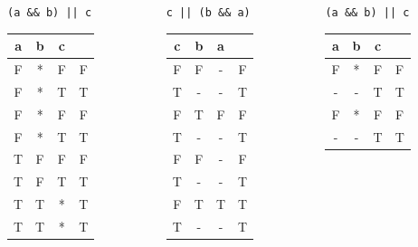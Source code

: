 \documentclass[xcolor = {dvipsnames, table}, aspectratio=169]{beamer}
\begin{document}
\begin{frame}
    \begin{columns}
        \begin{column}{0.3\textwidth}
            \centering
            \lstinline{(a && b) || c}
            \begin{tabular}{c c c | c}
                a & b & c & \\
                \hline
                F & * & F & F \\
                F & * & T & T \\
                F & * & F & F \\
                F & * & T & T \\

                T & F & F & F \\
                T & F & T & T \\
                T & T & * & T \\
                T & T & * & T \\
            \end{tabular}
        \end{column}

        \begin{column}{0.3\textwidth}
            \centering
            \lstinline{c || (b && a)}
            \begin{tabular}{c c c | c}
                c & b & a & \\
                \hline
                F & F & - & F \\
                T & - & - & T \\
                F & T & F & F \\
                T & - & - & T \\

                F & F & - & F \\
                T & - & - & T \\
                F & T & T & T \\
                T & - & - & T \\
            \end{tabular}
        \end{column}

        \begin{column}{0.3\textwidth}
            \centering
            \lstinline{(a && b) || c}
            \begin{tabular}{c c c | c}
                a & b & c & \\
                \hline
                F & * & F & F \\
                - & - & T & T \\
                F & * & F & F \\
                - & - & T & T \\


\end{tabular}
\end{column}
\end{columns}
\end{frame}
\end{document}
